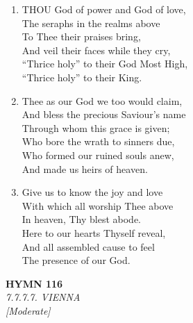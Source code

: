 \documentclass[11pt,a4paper]{article}
\begin{document}
\begin{enumerate}
    \item THOU God of power and God of love, \\
        The seraphs in the realms above \\
        To Thee their praises bring, \\
        And veil their faces while they cry, \\
        ``Thrice holy'' to their God Most High, \\
        ``Thrice holy'' to their King.

    \item Thee as our God we too would claim, \\
        And bless the precious Saviour's name \\
        Through whom this grace is given; \\
        Who bore the wrath to sinners due, \\
        Who formed our ruined souls anew, \\
        And made us heirs of heaven.

    \item Give us to know the joy and love \\
        With which all worship Thee above \\
        In heaven, Thy blest abode. \\
        Here to our hearts Thyself reveal, \\
        And all assembled cause to feel \\
        The presence of our God.

\end{enumerate}

\newpage
\begin{center}
    {\Large \textbf{HYMN 116}}
    \\
    \textit{7.7.7.7. VIENNA}
    \\
    \textit{\small [Moderate]}
\end{center}
\vspace{1em}
\end{document}
